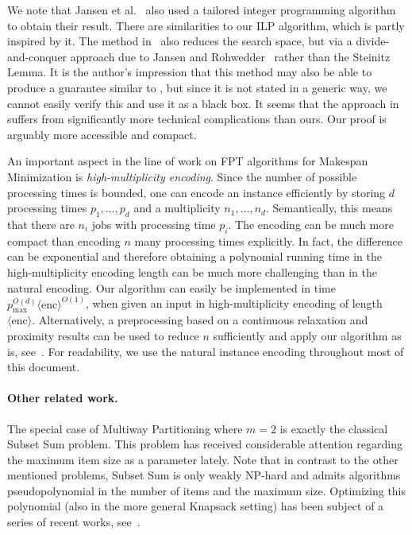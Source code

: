 \documentclass{article}
\begin{document}
We note that Jansen et al.~\cite{JansenKPT24} also used a tailored integer programming algorithm to obtain
their result.
There are similarities to our ILP algorithm, which is partly inspired by it.
The method in~\cite{jansen2023integer} also reduces the search space, but
via a divide-and-conquer approach due to Jansen and Rohwedder~\cite{jansen2023integer} rather than the Steinitz Lemma.
It is the author's impression that this method may also be able to produce a guarantee similar to ,
but since it is not stated in a generic way, we cannot easily verify this and use it as a black box.
It seems that the approach in~\cite{JansenKPT24} suffers from significantly more technical complications than ours.
Our proof is arguably more accessible and compact.

An important aspect in the line of work on FPT algorithms for Makespan Minimization is
\emph{high-multiplicity encoding}. Since the number of possible processing times is bounded, one can
encode an instance efficiently by storing $d$ processing times $p_1,\dotsc,p_d$ and a multiplicity $n_1,\dotsc,n_d$.
Semantically, this means that there are $n_i$ jobs with processing time $p_i$. The encoding
can be much more compact than encoding $n$ many processing times explicitly. In fact, the difference
can be exponential and therefore obtaining a polynomial running time in the high-multiplicity encoding length
can be much more challenging than in the natural encoding. 
Our algorithm can easily be implemented in time $p_{\max}^{O(d)} \langle \mathrm{enc} \rangle^{O(1)}$,
when given an input in high-multiplicity encoding of length $\langle \mathrm{enc} \rangle$.
Alternatively, a preprocessing based on a continuous relaxation and proximity results
can be used to reduce $n$ sufficiently and apply our algorithm as is, see~\cite{brinkop2024}.
For readability, we use the natural instance encoding throughout most of this document.

\paragraph{Other related work.}
The special case of Multiway Partitioning where $m = 2$ is exactly the classical Subset Sum
problem. This problem has received considerable attention regarding the maximum item size
as a parameter lately. Note that in contrast to the other mentioned problems, Subset Sum is only weakly
NP-hard and admits algorithms pseudopolynomial in the number of items and the maximum size.
Optimizing this polynomial (also in the more general Knapsack setting) has been subject of a series of recent works,
see~\cite{polak2021knapsack, jin20240, chen2024faster, bringmann2024knapsack}.
\end{document}
